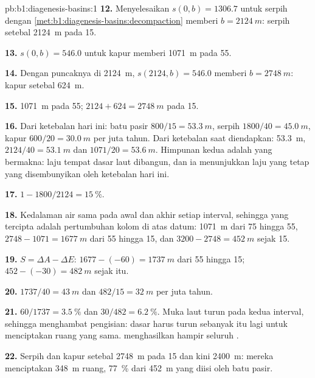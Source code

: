 \begin{solution}{pb:b1:diagenesis-basins:1}
\textbf{12.} Menyelesaikan $s(0, b) = 1306.7$ untuk serpih dengan
\cref{met:b1:diagenesis-basins:decompaction} memberi $b = \qty{2124}{m}$: serpih setebal
\qty{2124}{m} pada \qty{15}{\Ma}.

\textbf{13.} $s(0, b) = 546.0$ untuk kapur memberi \qty{1071}{m} pada \qty{55}{\Ma}.

\textbf{14.} Dengan puncaknya di \qty{2124}{m}, $s(2124, b) = 546.0$ memberi $b =
\qty{2748}{m}$: kapur setebal \qty{624}{m}.

\textbf{15.} \qty{1071}{m} pada \qty{55}{\Ma}; $2124 + 624 = \qty{2748}{m}$ pada
\qty{15}{\Ma}.

\textbf{16.} Dari ketebalan hari ini: batu pasir $800/15 = \qty{53.3}{m}$, serpih
$1800/40 = \qty{45.0}{m}$, kapur $600/20 = \qty{30.0}{m}$ per juta tahun. Dari
ketebalan saat diendapkan: \qty{53.3}{m}, $2124/40 =
\qty{53.1}{m}$ dan $1071/20 = \qty{53.6}{m}$. Himpunan kedua adalah yang bermakna: laju tempat dasar laut dibangun,
dan ia menunjukkan laju yang tetap yang disembunyikan oleh ketebalan hari ini.

\textbf{17.} $1 - 1800/2124 = \qty{15}{\%}$.

\textbf{18.} Kedalaman air sama pada awal dan akhir setiap interval, sehingga 
yang tercipta adalah pertumbuhan kolom di atas datum: \qty{1071}{m} dari 75 hingga
\qty{55}{\Ma}, $2748 - 1071 = \qty{1677}{m}$ dari 55 hingga \qty{15}{\Ma}, dan
$3200 - 2748 = \qty{452}{m}$ sejak \qty{15}{\Ma}.

\textbf{19.} $S = \Delta A - \Delta E$: $1677 - (-60) = \qty{1737}{m}$ dari 55 hingga
\qty{15}{\Ma}; $452 - (-30) = \qty{482}{m}$ sejak itu.

\textbf{20.} $1737/40 = \qty{43}{m}$ dan $482/15 = \qty{32}{m}$ per juta tahun.

\textbf{21.} $60/1737 = \qty{3.5}{\%}$ dan $30/482 = \qty{6.2}{\%}$. Muka laut turun pada
kedua interval, sehingga  menghambat pengisian: dasar harus turun sebanyak itu
lagi untuk menciptakan ruang yang sama.  menghasilkan hampir seluruh .

\textbf{22.} Serpih dan kapur setebal \qty{2748}{m} pada \qty{15}{\Ma} dan kini
\qty{2400}{m}:  mereka menciptakan \qty{348}{m} ruang, \qty{77}{\%} dari
\qty{452}{m} yang diisi oleh batu pasir.


\end{solution}
